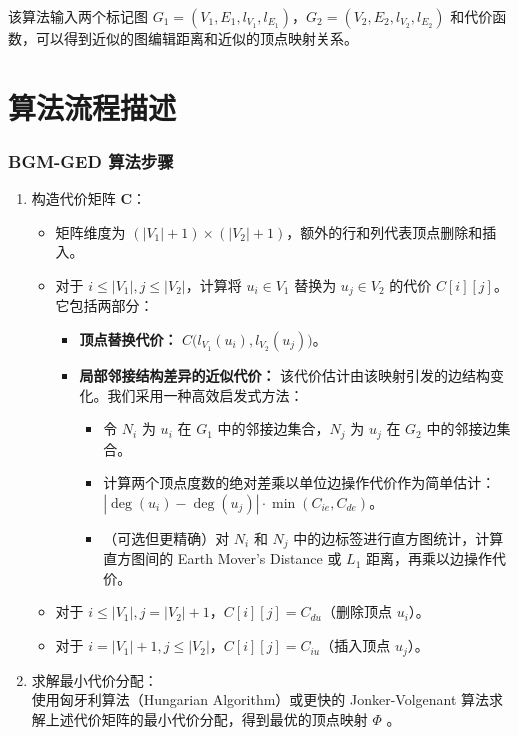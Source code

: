 该算法输入两个标记图 $G_1=(V_1,E_1,l_{V_1},l_{E_1})$，$G_2=(V_2,E_2,l_{V_2},l_{E_2})$ 和代价函数，可以得到近似的图编辑距离和近似的顶点映射关系。

\section{算法流程描述}
\subsubsection*{BGM-GED 算法步骤}

\begin{enumerate}[label=\arabic*.]

\item 构造代价矩阵 $\mathbf{C}$：
\begin{itemize}[leftmargin=*,nosep]
  \item 矩阵维度为 $(|V_1|+1)\times(|V_2|+1)$，额外的行和列代表顶点删除和插入。
  \item 对于 $i\le |V_1|,j\le |V_2|$，计算将 $u_i\in V_1$ 替换为 $u_j\in V_2$ 的代价 $C[i][j]$。它包括两部分：
  \begin{itemize}
    \item[a)] \textbf{顶点替换代价：} $C\!\bigl(l_{V_1}(u_i),l_{V_2}(u_j)\bigr)$。
    \item[b)] \textbf{局部邻接结构差异的近似代价：} 该代价估计由该映射引发的边结构变化。我们采用一种高效启发式方法：
    \begin{itemize}
      \item 令 $N_i$ 为 $u_i$ 在 $G_1$ 中的邻接边集合，$N_j$ 为 $u_j$ 在 $G_2$ 中的邻接边集合。
      \item 计算两个顶点度数的绝对差乘以单位边操作代价作为简单估计：
            $|\deg(u_i)-\deg(u_j)|\cdot\min(C_{ie},C_{de})$。
      \item （可选但更精确）对 $N_i$ 和 $N_j$ 中的边标签进行直方图统计，计算直方图间的 Earth Mover's Distance 或 $L_1$ 距离，再乘以边操作代价。
    \end{itemize}
  \end{itemize}
  \item 对于 $i\le |V_1|,j=|V_2|+1$，$C[i][j]=C_{du}$（删除顶点 $u_i$）。
  \item 对于 $i=|V_1|+1,j\le |V_2|$，$C[i][j]=C_{iu}$（插入顶点 $u_j$）。
\end{itemize}

\item 求解最小代价分配：\\
使用匈牙利算法（Hungarian Algorithm）或更快的 Jonker-Volgenant 算法求解上述代价矩阵的最小代价分配，得到最优的顶点映射 $\Phi$ \cite{riesen2009approximate}。


\end{enumerate}
